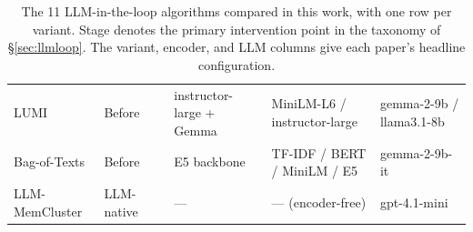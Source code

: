 \documentclass[11pt,a4paper,oneside]{report}
\begin{document}
\begin{table}[!htbp]
\begin{tabularx}{\textwidth}{@{}l l >{\raggedright\arraybackslash}p{2.7cm} >{\raggedright\arraybackslash}p{2.4cm} >{\raggedright\arraybackslash}X >{\raggedright\arraybackslash}X@{}}
LUMI                & Before     & \citet{lin2025lumi}                & instructor-large + Gemma & MiniLM-L6 / instructor-large       & gemma-2-9b / llama3.1-8b \\
Bag-of-Texts        & Before     & \citet{lin2025bagoftexts}          & E5 backbone              & TF-IDF / BERT / MiniLM / E5        & gemma-2-9b-it \\
LLM-MemCluster      & LLM-native & \citet{zhu2025memcluster}          & ---                      & --- (encoder-free)               & gpt-4.1-mini \\
\bottomrule
\end{tabularx}
\caption[The LLM-in-the-loop algorithm roster]{The 11 LLM-in-the-loop algorithms compared in this work, with one row per variant. Stage denotes the primary intervention point in the taxonomy of \S\ref{sec:llmloop}. The variant, encoder, and LLM columns give each paper's headline configuration.}
\label{tab:roster}
\end{table}
\end{document}
